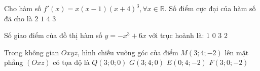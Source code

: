 \begin{ex}%
Cho hàm số $f'(x)=x(x-1)(x+4)^3, \forall x \in \mathbb{R}$. Số điểm cực đại của hàm số đã cho là
\choice
{$2$}
{\True $1$}
{$4$}
{$3$}

\end{ex}
\begin{ex}%
Số giao điểm của đồ thị hàm số $y=-x^3+6 x$ với trục hoành là:
\choice
{$1$}
{$0$}
{\True $3$}
{$2$}

\end{ex}
\begin{ex}%
Trong không gian $O x y z$, hình chiếu vuông góc của điểm $M(3; 4;-2)$ lên mặt phẳng $(O x z)$ có tọa độ là
\choice
{$Q(3; 0; 0)$}
{$G(3; 4; 0)$}
{$E(0; 4;-2)$}
{\True $F(3; 0;-2)$}

\end{ex}

